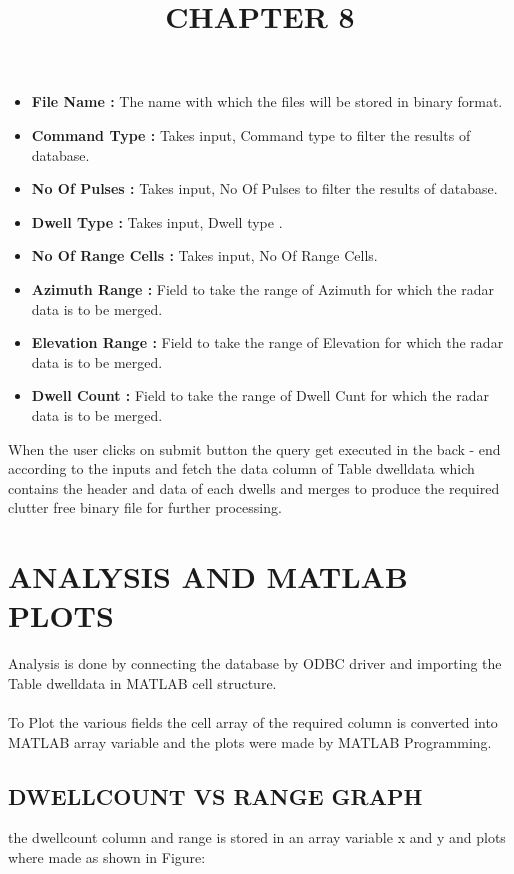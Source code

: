 \documentclass[14pt]{article} %
\begin{document}
  \begin{itemize} 
  \item[] \textbf{File Name : } The name with which the files will be stored in binary format.
  \item[] \textbf{Command Type : }Takes input, Command type to filter the results of database. 
  \item[] \textbf{No Of Pulses : }Takes input, No Of Pulses to filter the results of database. 
  \item[] \textbf{Dwell Type : }Takes input, Dwell type .   
  \item[] \textbf{No Of Range Cells : }Takes input, No Of Range Cells.
  \item[] \textbf{Azimuth Range : }Field to take the range of Azimuth for which the radar data is to be merged.
  \item[] \textbf{Elevation Range : }Field to take the range of Elevation for which the radar data is to be merged.
  \item[] \textbf{Dwell Count : }Field to take the range of Dwell Cunt for which the radar data is to be merged.
  \end{itemize}
  When the user clicks on submit button the query get executed in the back - end according to the inputs and fetch the data column of Table dwelldata which contains the header and data of each dwells and merges to produce the required clutter free binary file for further processing.
  
  \title{CHAPTER 8}
\maketitle
\section{ANALYSIS AND MATLAB PLOTS}
Analysis is done by connecting the database by ODBC driver and importing the Table dwelldata in MATLAB cell structure.
\\
\\To Plot the various fields the cell array of the required column is converted into MATLAB array variable and the plots were made by MATLAB Programming.
\subsection{DWELLCOUNT VS RANGE GRAPH}
the dwellcount column   and range is stored in an array variable x and y and plots where made as shown in Figure:
\end{document}
